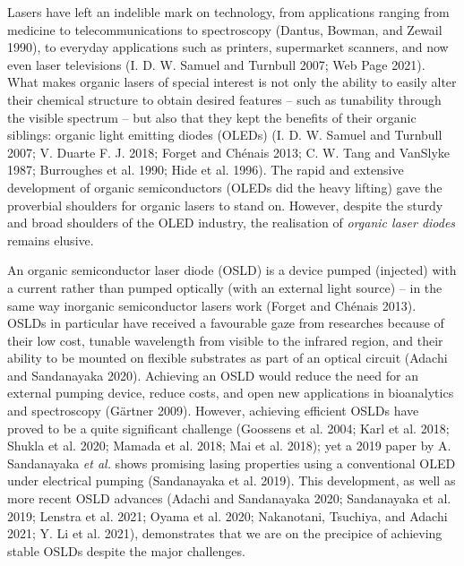 \documentclass[
  letterpaper,
  DIV=11,
  numbers=noendperiod,
  oneside]{scrreprt}
\begin{document}
Lasers have left an indelible mark on technology, from applications
ranging from medicine to telecommunications to spectroscopy (Dantus,
Bowman, and Zewail 1990), to everyday applications such as printers,
supermarket scanners, and now even laser televisions (I. D. W. Samuel
and Turnbull 2007; Web Page 2021). What makes organic lasers of special
interest is not only the ability to easily alter their chemical
structure to obtain desired features -- such as tunability through the
visible spectrum -- but also that they kept the benefits of their
organic siblings: organic light emitting diodes (OLEDs) (I. D. W. Samuel
and Turnbull 2007; V. Duarte F. J. 2018; Forget and Chénais 2013; C. W.
Tang and VanSlyke 1987; Burroughes et al. 1990; Hide et al. 1996). The
rapid and extensive development of organic semiconductors (OLEDs did the
heavy lifting) gave the proverbial shoulders for organic lasers to stand
on. However, despite the sturdy and broad shoulders of the OLED
industry, the realisation of \emph{organic laser diodes} remains
elusive.

An organic semiconductor laser diode (OSLD) is a device pumped
(injected) with a current rather than pumped optically (with an external
light source) -- in the same way inorganic semiconductor lasers work
(Forget and Chénais 2013). OSLDs in particular have received a
favourable gaze from researches because of their low cost, tunable
wavelength from visible to the infrared region, and their ability to be
mounted on flexible substrates as part of an optical circuit (Adachi and
Sandanayaka 2020). Achieving an OSLD would reduce the need for an
external pumping device, reduce costs, and open new applications in
bioanalytics and spectroscopy (Gärtner 2009). However, achieving
efficient OSLDs have proved to be a quite significant challenge
(Goossens et al. 2004; Karl et al. 2018; Shukla et al. 2020; Mamada et
al. 2018; Mai et al. 2018); yet a 2019 paper by A. Sandanayaka \emph{et
al.} shows promising lasing properties using a conventional OLED under
electrical pumping (Sandanayaka et al. 2019). This development, as well
as more recent OSLD advances (Adachi and Sandanayaka 2020; Sandanayaka
et al. 2019; Lenstra et al. 2021; Oyama et al. 2020; Nakanotani,
Tsuchiya, and Adachi 2021; Y. Li et al. 2021), demonstrates that we are
on the precipice of achieving stable OSLDs despite the major challenges.
\end{document}
